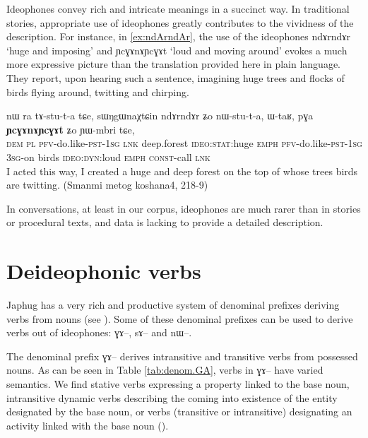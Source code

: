 \documentclass[oldfontcommands,oneside,a4paper,11pt]{article}
\newcommand{\ipa}[1]{{\phon \mbox{#1}}} %
\begin{document}
  
Ideophones convey  rich and intricate meanings in a succinct way. In traditional stories, appropriate use of ideophones greatly contributes to the vividness of the description. For instance, in  \ref{ex:ndArndAr}, the use of the ideophones \ipa{ndɤrndɤr}     `huge and imposing'	and 	\ipa{ɲcɣɤnɤɲcɣɤt} `loud and moving around' evokes  a much more expressive picture than the  translation provided here in plain language. They report, upon hearing such a sentence, imagining huge trees and flocks of birds flying around, twitting and chirping.

\begin{exe}
\ex \label{ex:ndArndAr}
 \gll 
\ipa{nɯ}  	\ipa{ra}  	\ipa{tɤ-stu-t-a}  	\ipa{tɕe,}  	\ipa{sɯŋgɯnaχtɕin}  	\ipa{ndɤrndɤr}  	\ipa{ʑo}  	\ipa{nɯ-stu-t-a,}  	\ipa{ɯ-taʁ,}  	\ipa{pɣa}  	\ipa{\textbf{ɲcɣɤnɤɲcɣɤt}}  	\ipa{ʑo}  	\ipa{ɲɯ-mbri}  	\ipa{tɕe,}  \\
\textsc{dem} \textsc{pl} \textsc{pfv}-do.like-\textsc{pst-1sg} \textsc{lnk} deep.forest \textsc{ideo:stat}:huge \textsc{emph} \textsc{pfv}-do.like-\textsc{pst-1sg} \textsc{3sg}-on birds \textsc{ideo:dyn}:loud \textsc{emph} \textsc{const}-call \textsc{lnk} \\
\glt I acted this way, I created a huge and deep forest on the top of whose trees birds are twitting. (Smanmi metog koshana4, 218-9)
\end{exe}



In conversations, at least in our corpus, ideophones are much rarer than in stories or procedural texts, and data is lacking to provide a detailed description. 

  
 \section{Deideophonic verbs} \label{sec:deideophonic}
 Japhug has a very rich and productive   system of denominal prefixes deriving verbs from nouns (see \citealt{jacques12incorp, jacques14antipassive}). Some of these denominal prefixes can be used to derive verbs out of ideophones: \ipa{ɣɤ--}, \ipa{sɤ--} and \ipa{nɯ--}.
 
 The denominal prefix \ipa{ɣɤ--} derives intransitive and transitive verbs from possessed nouns. As can be seen in Table \ref{tab:denom.GA},  verbs in \ipa{ɣɤ--} have  varied semantics. We find stative verbs expressing a property linked to the base noun, intransitive dynamic verbs describing the coming into existence of the entity designated by the base noun, or  verbs  (transitive or intransitive) designating an activity linked with the base noun (\citealt[1218]{jacques12incorp}).
 
\end{document}
